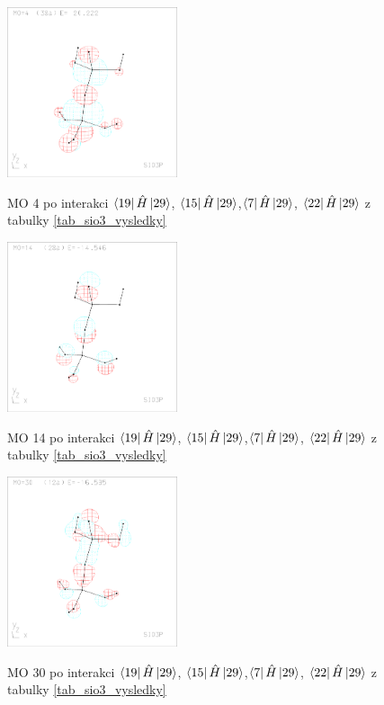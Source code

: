 \documentclass[
  digital, %
  table,   %
  lof,     %
  lot,     %
]{fithesis3}
\begin{document}
\begin{figure}[h]
\caption{MO 4 po interakci $\bra{19}{\hat{H}}\ket{29}$, $\bra{15}{\hat{H}}\ket{29}$,$\bra{7}{\hat{H}}\ket{29}$, $\bra{22}{\hat{H}}\ket{29}$ z tabulky \ref{tab_sio3_vysledky}}
  \center
  \includegraphics[width=5cm]{sio3p_obrazky/mo_4.eps}
  \label{obr_sio3_MO_4}
  \end{figure}

\begin{figure}[h]
\caption{MO 14 po interakci $\bra{19}{\hat{H}}\ket{29}$, $\bra{15}{\hat{H}}\ket{29}$,$\bra{7}{\hat{H}}\ket{29}$, $\bra{22}{\hat{H}}\ket{29}$ z tabulky \ref{tab_sio3_vysledky}}
  \center
  \includegraphics[width=5cm]{sio3p_obrazky/mo_14.eps}
  \label{obr_sio3_MO_14}
  \end{figure}

\begin{figure}[h]
\caption{MO 30 po interakci $\bra{19}{\hat{H}}\ket{29}$, $\bra{15}{\hat{H}}\ket{29}$,$\bra{7}{\hat{H}}\ket{29}$, $\bra{22}{\hat{H}}\ket{29}$ z tabulky \ref{tab_sio3_vysledky}}
  \center
  \includegraphics[width=5cm]{sio3p_obrazky/mo_30.eps}
  \label{obr_sio3_MO_30}
  \end{figure}
\end{document}
